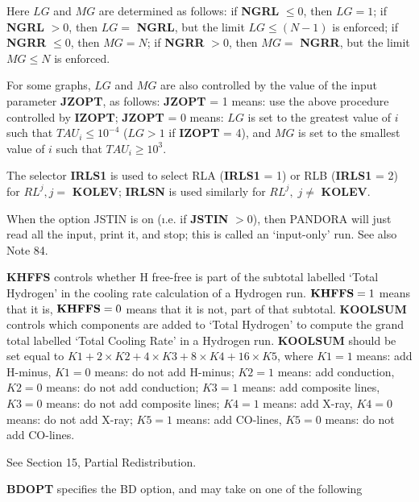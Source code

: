 Here $LG$ and $MG$ are determined as follows: 
if {\bf NGRL} $\leq 0$, then $LG = 1$; if {\bf NGRL} $> 0$, then 
$LG = $ {\bf NGRL}, but the limit $LG \leq (N-1)$ is enforced;
if {\bf NGRR} $\leq 0$, then $MG = N$; if {\bf NGRR} $> 0$, then
$MG = $ {\bf NGRR}, but the limit $MG \leq N$ is enforced.

For some graphs, $LG$ and $MG$ are also controlled by the value of the
input parameter {\bf JZOPT}, as follows: \np
{\bf JZOPT} = 1 means: use the above procedure controlled by {\bf IZOPT}; \np
{\bf JZOPT} = 0 means: $LG$ is set to the greatest value of $i$ such that
$TAU_i \leq 10^{-4}$ ($LG > 1$ if {\bf IZOPT} = 4), and $MG$ is set to the
smallest value of $i$ such that $TAU_i \geq 10^3$.
\ej
\centerline{}
\space \noindent
The selector {\bf IRLS1} is used to select RLA ({\bf IRLS1} = 1) or RLB
({\bf IRLS1} = 2) for $RL^j, j =$ {\bf KOLEV}; {\bf IRLSN} is used similarly
for $RL^j, \; j \neq$ {\bf KOLEV}.
\blankline
\blankline
\centerline{}
\space \noindent
When the option JSTIN is on ({\i.e.} if {\bf JSTIN} $ > 0$),
then PANDORA will just read all the input, print it,
and stop; this is called an `input-only' run. See also Note 84.
\blankline
\blankline
\centerline{}
\space \noindent
{\bf KHFFS} controls whether H free-free is part of the subtotal labelled
`Total Hydrogen' in the cooling rate calculation of a Hydrogen run.
${\bf KHFFS} = 1$ means that it is, ${\bf KHFFS} = 0$ means that it is
not, part of that subtotal. 
\spice \noindent
{\bf KOOLSUM} controls which components are added to `Total Hydrogen'
to compute the grand total labelled `Total Cooling Rate' in a
Hydrogen run. \np
{\bf KOOLSUM}
should be set equal to $K1 + 2 \times K2 + 4 \times K3 + 8 \times K4
+ 16 \times K5$, where\np
$K1 = 1$ means: add H-minus, $K1 = 0$ means: do not add H-minus; \np
$K2 = 1$ means: add conduction, $K2 = 0$ means: do not add conduction; \np
$K3 = 1$ means: add composite lines, $K3 = 0$ means: do not add composite
lines; \np
$K4 = 1$ means: add X-ray, $K4 = 0$ means: do not add X-ray; \np
$K5 = 1$ means: add CO-lines, $K5 = 0$ means: do not add CO-lines.
\blankline
\blankline
\centerline{}
\space \noindent
See Section 15, Partial Redistribution.
\blankline
\blankline
\centerline{}
\space \noindent
{\bf BDOPT} specifies the BD option, and may take on one of the following
